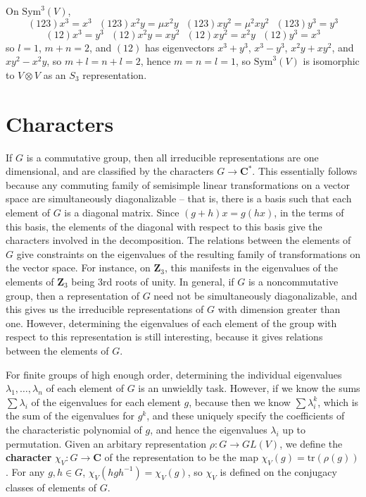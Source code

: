 \begin{example}
    On $\text{Sym}^3(V)$,
    \[ (1 2 3)x^3 = x^3\ \ \ (1 2 3)x^2y = \mu x^2y\ \ \ (1 2 3)xy^2 = \mu^2 xy^2\ \ \ (1 2 3)y^3 = y^3 \]
    \[ (1 2)x^3 = y^3\ \ \ (1 2)x^2y = xy^2\ \ \ (1 2)xy^2 = x^2y\ \ \ (1 2)y^3 = x^3 \]
    so $l = 1$, $m + n = 2$, and $(1 2)$ has eigenvectors $x^3 + y^3$, $x^3 - y^3$, $x^2y + xy^2$, and $xy^2 - x^2y$, so $m + l = n + l = 2$, hence $m = n = l = 1$, so $\text{Sym}^3(V)$ is isomorphic to $V \otimes V$ as an $S_3$ representation.
\end{example}

\section{Characters}

If $G$ is a commutative group, then all irreducible representations are one dimensional, and are classified by the characters $G \to \mathbf{C}^*$. This essentially follows because any commuting family of semisimple linear transformations on a vector space are simultaneously diagonalizable -- that is, there is a basis such that each element of $G$ is a diagonal matrix. Since $(g + h)x = g(hx)$, in the terms of this basis, the elements of the diagonal with respect to this basis give the characters involved in the decomposition. The relations between the elements of $G$ give constraints on the eigenvalues of the resulting family of transformations on the vector space. For instance, on $\mathbf{Z}_3$, this manifests in the eigenvalues of the elements of $\mathbf{Z}_3$ being 3rd roots of unity. In general, if $G$ is a noncommutative group, then a representation of $G$ need not be simultaneously diagonalizable, and this gives us the irreducible representations of $G$ with dimension greater than one. However, determining the eigenvalues of each element of the group with respect to this representation is still interesting, because it gives relations between the elements of $G$.

For finite groups of high enough order, determining the individual eigenvalues $\lambda_1, \dots, \lambda_n$ of each element of $G$ is an unwieldly task. However, if we know the sums $\sum \lambda_i$ of the eigenvalues for each element $g$, because then we know $\sum \lambda_i^k$, which is the sum of the eigenvalues for $g^k$, and these uniquely specify the coefficients of the characteristic polynomial of $g$, and hence the eigenvalues $\lambda_i$ up to permutation. Given an arbitary representation $\rho: G \to GL(V)$, we define the {\bf character} $\chi_V: G \to \mathbf{C}$ of the representation to be the map $\chi_V(g) = \text{tr}(\rho(g))$. For any $g,h \in G$, $\chi_V(hgh^{-1}) = \chi_V(g)$, so $\chi_V$ is defined on the conjugacy classes of elements of $G$.

